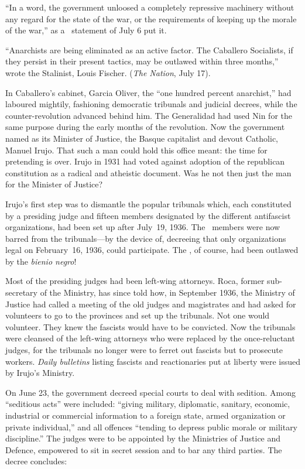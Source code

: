 ``In a word, the government unloosed a completely repressive machinery without any regard for the state of the war, or the requirements of keeping up the morale of the war,'' as a \FAI\ statement of July 6 put it.

``Anarchists are being eliminated as an active factor. The Caballero Socialists, if they persist in their present tactics, may be outlawed within three months,'' wrote the Stalinist, Louis Fischer. (\emph{The Nation}, July 17).

\bigskip

In Caballero’s cabinet, Garcia Oliver, the ``one hundred percent anarchist,'' had laboured mightily, fashioning democratic tribunals and judicial decrees, while the counter-revolution advanced behind him. The Generalidad had used Nin for the same purpose during the early months of the revolution. Now the government named as its Minister of Justice, the Basque capitalist and devout Catholic, Manuel Irujo. That such a man could hold this office meant: the time for pretending is over. Irujo in 1931 had voted against adoption of the republican constitution as a radical and atheistic document. Was he not then just the man for the Minister of Justice?

Irujo’s first step was to dismantle the popular tribunals which, each constituted by a presiding judge and fifteen members designated by the different antifascist organizations, had been set up after July~19, 1936. The \FAI\ members were now barred from the tribunals---by the device of, decreeing that only organizations legal on February~16, 1936, could participate. The \FAI, of course, had been outlawed by the \emph{bienio negro}!

Most of the presiding judges had been left-wing attorneys. Roca, former sub-secretary of the Ministry, has since told how, in September 1936, the Ministry of Justice had called a meeting of the old judges and magistrates and had asked for volunteers to go to the provinces and set up the tribunals. Not one would volunteer. They knew the fascists would have to be convicted. Now the tribunals were cleansed of the left-wing attorneys who were replaced by the once-reluctant judges, for the tribunals no longer were to ferret out fascists but to prosecute workers. \emph{Daily bulletins} listing fascists and reactionaries put at liberty were issued by Irujo’s Ministry.

On June 23, the government decreed special courts to deal with sedition. Among ``seditious acts'' were included: ``giving military, diplomatic, sanitary, economic, industrial or commercial information to a foreign state, armed organization or private individual,'' and all offences ``tending to depress public morale or military discipline.'' The judges were to be appointed by the Ministries of Justice and Defence, empowered to sit in secret session and to bar any third parties. The decree concludes:

